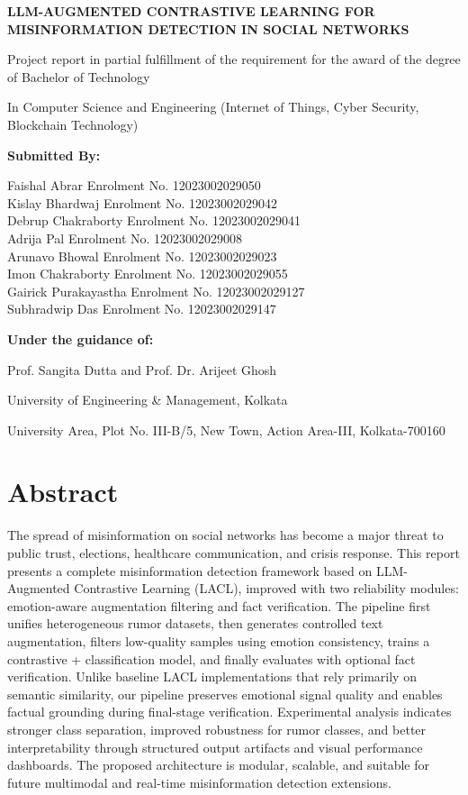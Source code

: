 \documentclass[12pt,a4paper]{report}
\begin{document}
\begin{titlepage}
\centering
{\Large \textbf{LLM-AUGMENTED CONTRASTIVE LEARNING FOR MISINFORMATION DETECTION IN SOCIAL NETWORKS}\par}
\vspace{1cm}
Project report in partial fulfillment of the requirement for the award of the degree of Bachelor of Technology\par
In Computer Science and Engineering (Internet of Things, Cyber Security, Blockchain Technology)\par
\vspace{1cm}
\textbf{Submitted By:}\par
Faishal Abrar \quad Enrolment No. 12023002029050\\
Kislay Bhardwaj \quad Enrolment No. 12023002029042\\
Debrup Chakraborty \quad Enrolment No. 12023002029041\\
Adrija Pal \quad Enrolment No. 12023002029008\\
Arunavo Bhowal \quad Enrolment No. 12023002029023\\
Imon Chakraborty \quad Enrolment No. 12023002029055\\
Gairick Purakayastha \quad Enrolment No. 12023002029127\\
Subhradwip Das \quad Enrolment No. 12023002029147\par
\vspace{0.8cm}
\textbf{Under the guidance of:}\par
Prof. Sangita Dutta and Prof. Dr. Arijeet Ghosh\par
\vspace{0.8cm}
University of Engineering \& Management, Kolkata\par
University Area, Plot No. III-B/5, New Town, Action Area-III, Kolkata-700160\par
\vfill
\end{titlepage}

\chapter*{Abstract}
The spread of misinformation on social networks has become a major threat to public trust, elections, healthcare communication, and crisis response. This report presents a complete misinformation detection framework based on LLM-Augmented Contrastive Learning (LACL), improved with two reliability modules: emotion-aware augmentation filtering and fact verification. The pipeline first unifies heterogeneous rumor datasets, then generates controlled text augmentation, filters low-quality samples using emotion consistency, trains a contrastive + classification model, and finally evaluates with optional fact verification. Unlike baseline LACL implementations that rely primarily on semantic similarity, our pipeline preserves emotional signal quality and enables factual grounding during final-stage verification. Experimental analysis indicates stronger class separation, improved robustness for rumor classes, and better interpretability through structured output artifacts and visual performance dashboards. The proposed architecture is modular, scalable, and suitable for future multimodal and real-time misinformation detection extensions.
\end{document}
